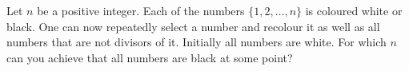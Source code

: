 Let $n$ be a positive integer. Each of the numbers $\{1,2,\ldots,n\}$ is coloured white or black.
One can now repeatedly select a number and recolour it as well as all numbers that are not divisors of it.
Initially all numbers are white. For which $n$ can you achieve that all numbers are black at some point?